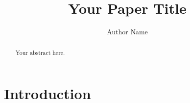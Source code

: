\documentclass{article}
\title{Your Paper Title}
\author{Author Name}
\begin{document}
\maketitle

\begin{abstract}
Your abstract here.
\end{abstract}

\section{Introduction}
\end{document}

